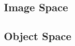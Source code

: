 \documentclass[11pt, oneside]{scrartcl}   	%
\begin{document}
\subsection{Image Space}


\subsection{Object Space}

\end{document}
